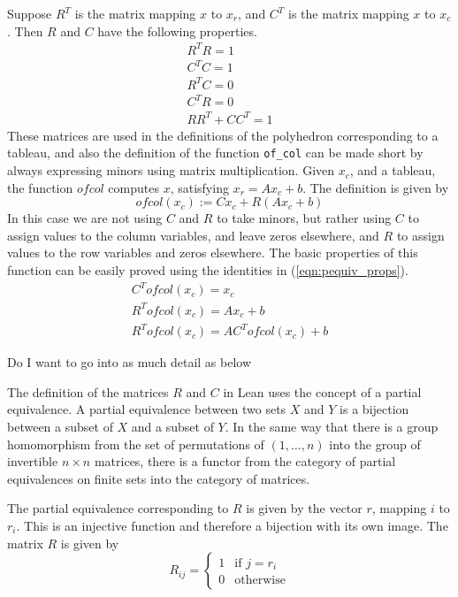 \documentclass[11pt]{article} %
\begin{document}
Suppose $R^T$ is the matrix mapping $x$ to $x_r$, and $C^T$ is the matrix mapping $x$ to $x_c$. Then $R$ and $C$ have the following properties.
\begin{equation}\label{eqn:pequiv_props}
  \begin{aligned}
    R^TR = 1 \\
    C^TC = 1 \\
    R^TC = 0 \\
    C^TR = 0 \\
    RR^T + CC^T = 1
  \end{aligned}
\end{equation}
These matrices are used in the definitions of the polyhedron corresponding to a tableau, and also the definition of the function \lstinline|of_col| can be made short by always expressing minors using matrix multiplication. Given $x_c$, and a tableau, the function $ofcol$ computes $x$, satisfying $x_r = Ax_c + b$. The definition is given by
\begin{equation}
  ofcol(x_c) := Cx_c + R(Ax_c+b)
\end{equation}
In this case we are not using $C$ and $R$ to take minors, but rather using $C$ to assign values to the column variables, and leave zeros elsewhere, and $R$ to assign values to the row variables and zeros elsewhere. The basic properties of this function can be easily proved using the identities in (\ref{eqn:pequiv_props}).
\begin{equation}
  \begin{aligned}
    C^Tofcol(x_c) = x_c \\
    R^Tofcol(x_c) = Ax_c + b \\
    R^Tofcol(x_c) = AC^Tofcol(x_c) + b
  \end{aligned}
\end{equation}

\color{red} Do I want to go into as much detail as below\color{black}

The definition of the matrices $R$ and $C$ in Lean uses the concept of a partial equivalence. A partial equivalence between two sets $X$ and $Y$ is a bijection between a subset of $X$ and a subset of $Y$. In the same way that there is a group homomorphism from the set of permutations of $(1, \dots, n)$ into the group of invertible $n \times n$ matrices, there is a functor from the category of partial equivalences on finite sets into the category of matrices.

The partial equivalence corresponding to $R$ is given by the vector $r$, mapping $i$ to $r_i$. This is an injective function and therefore a bijection with its own image. The matrix $R$ is given by
\begin{equation}
R_{ij} =
\begin{cases}
1 & \text{if } j = r_i \\
0 & \text{otherwise}
\end{cases}
\end{equation}
\end{document}
